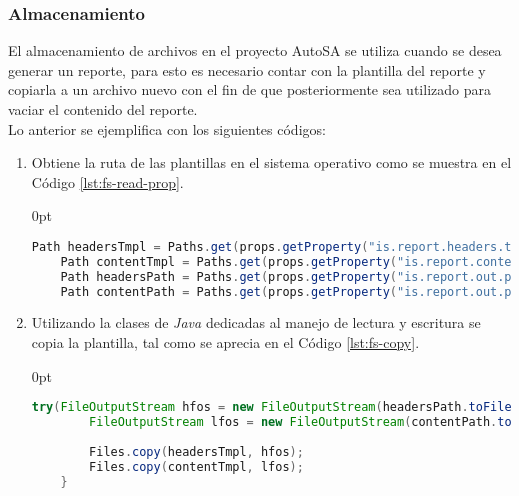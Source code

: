 \subsubsection{Almacenamiento}
El almacenamiento de archivos en el proyecto AutoSA se utiliza cuando se desea generar un reporte, para esto es necesario contar con la plantilla del reporte y copiarla a un archivo nuevo con el fin de que posteriormente sea utilizado para vaciar el contenido del reporte.\\
Lo anterior se ejemplifica con los siguientes códigos:
\begin{enumerate}
	\item Obtiene la ruta de las plantillas en el sistema operativo como se muestra en el Código \ref{lst:fs-read-prop}.
	\begin{adjustwidth}{\listingfixwidth}{0pt}
	\begin{lstlisting}[language=Java, caption={Obtención de las rutas de las plantillas.}, captionpos=b, label={lst:fs-read-prop}]
	Path headersTmpl = Paths.get(props.getProperty("is.report.headers.tmpl"));
	Path contentTmpl = Paths.get(props.getProperty("is.report.content.tmpl"));
	Path headersPath = Paths.get(props.getProperty("is.report.out.path"), headersTmpl.getFileName().toString());
	Path contentPath = Paths.get(props.getProperty("is.report.out.path"), contentTmpl.getFileName().toString());
	\end{lstlisting}
	\end{adjustwidth}

	\item Utilizando la clases de \textit{Java} dedicadas al manejo de lectura y escritura se copia la plantilla, tal como se aprecia en el Código \ref{lst:fs-copy}.

\pagebreak
	
	\begin{adjustwidth}{\listingfixwidth}{0pt}
	\begin{lstlisting}[language=Java, caption={Copia de archivos.}, captionpos=b, label={lst:fs-copy}]
	try(FileOutputStream hfos = new FileOutputStream(headersPath.toFile(), false);
		FileOutputStream lfos = new FileOutputStream(contentPath.toFile(), false)){
		
		Files.copy(headersTmpl, hfos);
		Files.copy(contentTmpl, lfos);
	}
	\end{lstlisting}
	\end{adjustwidth}
\end{enumerate}
